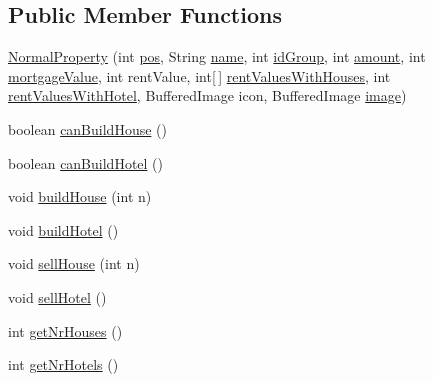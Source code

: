 \subsection*{Public Member Functions}
\begin{DoxyCompactItemize}
\item 
\hyperlink{class_monopoly_1_1_logic_1_1_normal_property_a175bcb0bb1aa6eab66ba1c8289286da6}{Normal\+Property} (int \hyperlink{class_monopoly_1_1_logic_1_1_board_box_a750c8300a134809e0eb5772b3ba92258}{pos}, String \hyperlink{class_monopoly_1_1_logic_1_1_board_box_ad5cd8d9fc191dc2df82b9fe7766210fd}{name}, int \hyperlink{class_monopoly_1_1_logic_1_1_property_ab42a31cd99e909728aa49c0184f644b8}{id\+Group}, int \hyperlink{class_monopoly_1_1_logic_1_1_property_a3e5525c94c56e900372c5a13a8fe03fb}{amount}, int \hyperlink{class_monopoly_1_1_logic_1_1_property_ae4b874ede5de05f1f5b0ab329c2c58f5}{mortgage\+Value}, int rent\+Value, int\mbox{[}$\,$\mbox{]} \hyperlink{class_monopoly_1_1_logic_1_1_normal_property_a918c6693fd0638db23698322ae3fdad3}{rent\+Values\+With\+Houses}, int \hyperlink{class_monopoly_1_1_logic_1_1_normal_property_af1d8fcccf72faa5a718594967213ba55}{rent\+Values\+With\+Hotel}, Buffered\+Image icon, Buffered\+Image \hyperlink{class_monopoly_1_1_logic_1_1_board_box_a7d9f613b72c69740867388b59649d127}{image})
\item 
boolean \hyperlink{class_monopoly_1_1_logic_1_1_normal_property_ae0ce0c684f69d273faca595038f22fee}{can\+Build\+House} ()
\item 
boolean \hyperlink{class_monopoly_1_1_logic_1_1_normal_property_a35f3a983925352f7f4638288b458f918}{can\+Build\+Hotel} ()
\item 
void \hyperlink{class_monopoly_1_1_logic_1_1_normal_property_aaca96e1c246e9dbd9f31e26a5f849343}{build\+House} (int n)
\item 
void \hyperlink{class_monopoly_1_1_logic_1_1_normal_property_a5c8250cb6aa2761da7ac9b82a2da0453}{build\+Hotel} ()
\item 
void \hyperlink{class_monopoly_1_1_logic_1_1_normal_property_a12bd1cd22b4331260ffe4b4a71750218}{sell\+House} (int n)
\item 
void \hyperlink{class_monopoly_1_1_logic_1_1_normal_property_a878ab4447f7ca1c98d879f19521404a6}{sell\+Hotel} ()
\item 
int \hyperlink{class_monopoly_1_1_logic_1_1_normal_property_a17994f04f81b1494dcc4dec0b30c1bca}{get\+Nr\+Houses} ()
\item 
int \hyperlink{class_monopoly_1_1_logic_1_1_normal_property_a1ea1cfe8cea8ef479ea935e1ac221369}{get\+Nr\+Hotels} ()

\end{DoxyCompactItemize}
